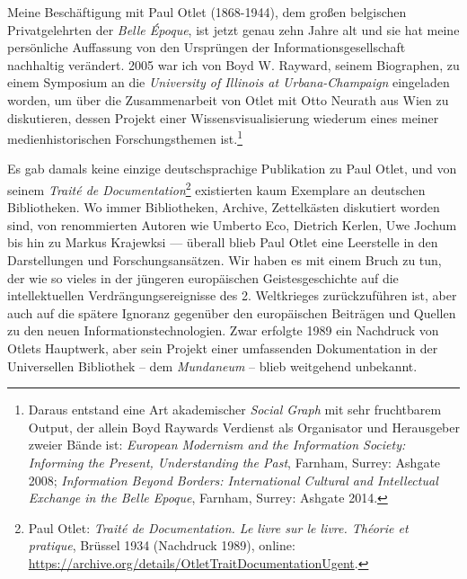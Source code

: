 \noindent Meine Beschäftigung mit Paul Otlet (1868-1944), dem großen belgischen
Privatgelehrten der \emph{Belle Époque}, ist jetzt genau zehn Jahre alt
und sie hat meine persönliche Auffassung von den Ursprüngen der
Informationsgesellschaft nachhaltig verändert. 2005 war ich von Boyd W.
Rayward, seinem Biographen, zu einem Symposium an die \emph{University
of Illinois at Urbana-Champaign} eingeladen worden, um über die
Zusammenarbeit von Otlet mit Otto Neurath aus Wien zu diskutieren,
dessen Projekt einer Wissensvisualisierung wiederum eines meiner
medienhistorischen Forschungsthemen ist.\footnote{Daraus entstand eine
  Art akademischer \emph{Social Graph} mit sehr fruchtbarem Output, der
  allein Boyd Raywards Verdienst als Organisator und Herausgeber zweier
  Bände ist: \emph{European Modernism and the Information Society:
  Informing the Present, Understanding the Past}, Farnham, Surrey:
  Ashgate 2008; \emph{Information Beyond Borders: International Cultural
  and Intellectual Exchange in the Belle Epoque}, Farnham, Surrey:
  Ashgate 2014.}

Es gab damals keine einzige deutschsprachige Publikation zu Paul Otlet,
und von seinem \emph{Traité de Documentation}\footnote{Paul Otlet:
  \emph{Traité de Documentation. Le livre sur le livre. Théorie et
  pratique}, Brüssel 1934 (Nachdruck 1989), online:
  \url{https://archive.org/details/OtletTraitDocumentationUgent}.}
existierten kaum Exemplare an deutschen Bibliotheken. Wo immer
Bibliotheken, Archive, Zettelkästen diskutiert worden sind, von
renommierten Autoren wie Umberto Eco, Dietrich Kerlen, Uwe Jochum bis
hin zu Markus Krajewksi --- überall blieb Paul Otlet eine Leerstelle in
den Darstellungen und Forschungsansätzen. Wir haben es mit einem Bruch
zu tun, der wie so vieles in der jüngeren europäischen Geistesgeschichte
auf die intellektuellen Verdrängungsereignisse des 2. Weltkrieges
zurückzuführen ist, aber auch auf die spätere Ignoranz gegenüber den
europäischen Beiträgen und Quellen zu den neuen
Informationstechnologien. Zwar erfolgte 1989 ein Nachdruck von Otlets
Hauptwerk, aber sein Projekt einer umfassenden Dokumentation in der
Universellen Bibliothek -- dem \emph{Mundaneum} -- blieb weitgehend
unbekannt.

